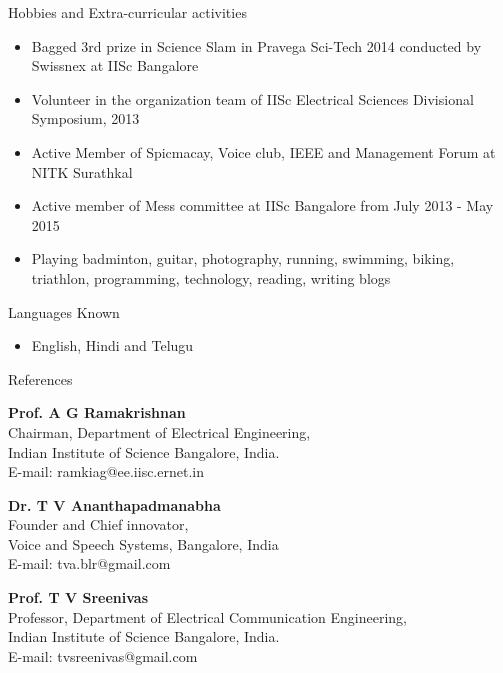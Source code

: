 \documentclass[10pt]{article}
\begin{document}
\begin{cv}
\begin{cvlist}{Hobbies and Extra-curricular activities}
\begin{itemize}
\item Bagged 3rd prize in Science Slam in Pravega Sci-Tech 2014 conducted by Swissnex at IISc Bangalore

\item Volunteer in the organization team of IISc Electrical Sciences Divisional Symposium, 2013
\item


Active Member of  Spicmacay, Voice club, IEEE and Management Forum
 at NITK Surathkal
 \item Active member of Mess committee at IISc Bangalore from July 2013 - May 2015
\item

Playing badminton, guitar,  photography,  running, swimming, biking, triathlon,  programming, technology, reading, writing blogs


	\end{itemize}

\end{cvlist}


\begin{cvlist}{Languages Known}
\item
\begin{itemize}\itemsep=0.25em
	\item English, Hindi and Telugu
	\end{itemize}

\end{cvlist}





\begin{cvlist}{References}
\item  \textbf{Prof. A G Ramakrishnan}\\
Chairman, Department of Electrical Engineering,\\
Indian Institute of Science Bangalore, India.\\
E-mail: ramkiag@ee.iisc.ernet.in

\item \textbf{Dr. T V Ananthapadmanabha}\\
Founder and Chief innovator,\\
 Voice and Speech Systems, Bangalore, India\\
E-mail:  tva.blr@gmail.com

\item \textbf{Prof. T V Sreenivas}\\
Professor, Department of Electrical Communication Engineering, \\
Indian Institute of Science Bangalore, India.\\
E-mail: tvsreenivas@gmail.com
\end{cvlist}



\setlength{\cvlabelwidth}{\oldcvlabelwidth}
\setlength{\cvlabelsep}{\oldcvlabelsep}

\end{cv}
\end{document}
